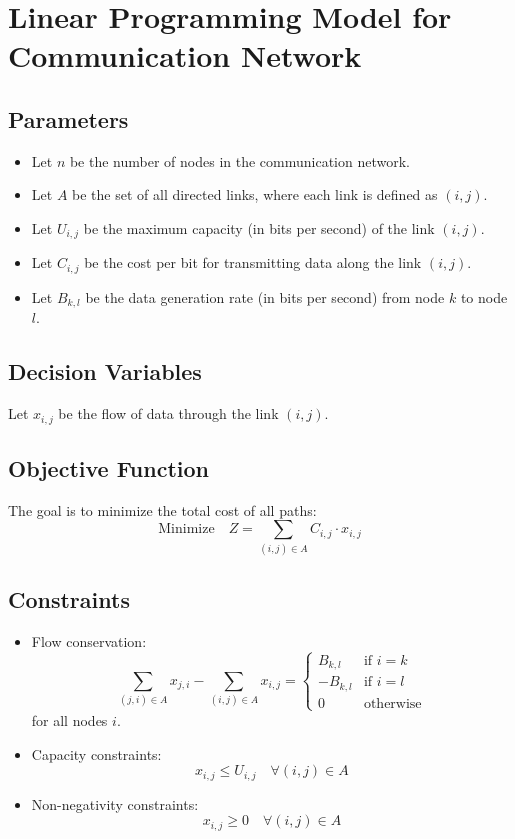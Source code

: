 \documentclass{article}
\begin{document}
\section*{Linear Programming Model for Communication Network}

\subsection*{Parameters}
\begin{itemize}
    \item Let \( n \) be the number of nodes in the communication network.
    \item Let \( A \) be the set of all directed links, where each link is defined as \( (i, j) \).
    \item Let \( U_{i,j} \) be the maximum capacity (in bits per second) of the link \( (i, j) \).
    \item Let \( C_{i,j} \) be the cost per bit for transmitting data along the link \( (i, j) \).
    \item Let \( B_{k,l} \) be the data generation rate (in bits per second) from node \( k \) to node \( l \).
\end{itemize}

\subsection*{Decision Variables}
Let \( x_{i,j} \) be the flow of data through the link \( (i,j) \).

\subsection*{Objective Function}
The goal is to minimize the total cost of all paths:
\[
\text{Minimize} \quad Z = \sum_{(i,j) \in A} C_{i,j} \cdot x_{i,j}
\]

\subsection*{Constraints}
\begin{itemize}
    \item Flow conservation:
    \[
    \sum_{(j,i) \in A} x_{j,i} - \sum_{(i,j) \in A} x_{i,j} = 
    \begin{cases}
    B_{k,l} & \text{if } i = k \\
    -B_{k,l} & \text{if } i = l \\
    0 & \text{otherwise}
    \end{cases}
    \]
    for all nodes \( i \).
    
    \item Capacity constraints:
    \[
    x_{i,j} \leq U_{i,j} \quad \forall (i,j) \in A
    \]

    \item Non-negativity constraints:
    \[
    x_{i,j} \geq 0 \quad \forall (i,j) \in A
    \]
\end{itemize}
\end{document}
